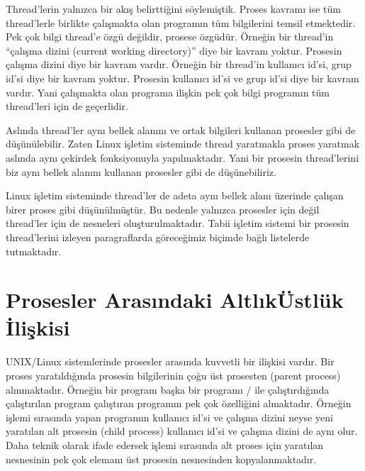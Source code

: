 \documentclass[a4paper,10pt,turkish]{sphinxmanual}
\begin{document}
\sphinxAtStartPar
Thread’lerin yalnızca bir akış belirttiğini söylemiştik. Proses kavramı ise tüm thread’lerle birlikte
çalışmakta olan programın tüm bilgilerini temsil etmektedir. Pek çok bilgi thread’e özgü değildir,
prosese özgüdür. Örneğin bir thread’in “çalışma dizini (current working directory)” diye bir kavram
yoktur. Prosesin çalışma dizini diye bir kavram vardır. Örneğin bir thread’in kullanıcı id’si, grup id’si
diye bir kavram yoktur. Prosesin kullanıcı id’si ve grup id’si diye bir kavram vardır. Yani çalışmakta
olan programa ilişkin pek çok bilgi programın tüm thread’leri için de geçerlidir.

\sphinxAtStartPar
Aslında thread’ler aynı bellek alanını ve ortak bilgileri kullanan prosesler gibi de düşünülebilir. Zaten
Linux işletim sisteminde thread yaratmakla proses yaratmak aslında aynı çekirdek fonksiyonuyla
yapılmaktadır. Yani bir prosesin thread’lerini biz aynı bellek alanını kullanan prosesler gibi de
düşünebiliriz.

\sphinxAtStartPar
Linux işletim sisteminde thread’ler de adeta aynı bellek alanı üzerinde çalışan birer proses gibi
düşünülmüştür. Bu nedenle yalnızca prosesler için değil thread’ler için de  nesneleri
oluşturulmaktadır. Tabii işletim sistemi bir prosesin thread’lerini izleyen paragraflarda göreceğimiz
biçimde bağlı listelerde tutmaktadır.


\section{Prosesler Arasındaki Altlık\sphinxhyphen{}Üstlük İlişkisi}
\label{\detokenize{processcontrolblock:prosesler-arasindaki-altlik-ustluk-iliskisi}}
\sphinxAtStartPar
UNIX/Linux sistemlerinde prosesler arasında kuvvetli bir  ilişkisi vardır.
Bir proses yaratıldığında prosesin  bilgilerinin çoğu üst prosesten (parent process)
alınmaktadır. Örneğin bir program başka bir programı / ile çalıştırdığında çalıştırılan
program çalıştıran programın pek çok özelliğini almaktadır. Örneğin  işlemi sırasında 
yapan programın kullanıcı id’si ve çalışma dizini neyse yeni yaratılan alt prosesin (child process)
kullanıcı id’si ve çalışma dizini de aynı olur. Daha teknik olarak ifade edersek  işlemi sırasında
alt proses için yaratılan  nesnesinin pek çok elemanı üst prosesin 
nesnesinden kopyalanmaktadır.
\end{document}
